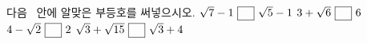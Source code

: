 다음 \blank\ 안에 알맞은 부등호를 써넣으시오.
 $\sqrt{7}-1\ \blank\ \sqrt{5}-1$
 $3+\sqrt{6}\ \blank\ 6$
 $4-\sqrt{2}\ \blank\ 2$
 $\sqrt{3}+\sqrt{15}\ \blank\ \sqrt{3}+4$
